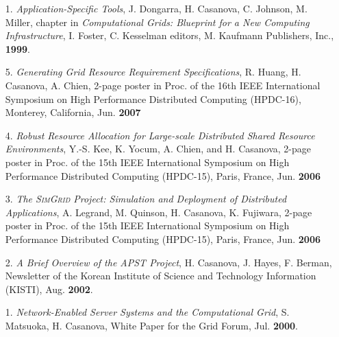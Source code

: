 \begin{itemize}
\item[1.]
{\it Application-Specific Tools}, J. Dongarra, H. Casanova, C. Johnson,
M. Miller, chapter in {\it Computational Grids: Blueprint for a New
Computing Infrastructure}, I. Foster, C. Kesselman editors, M. Kaufmann
Publishers, Inc., {\bf 1999}.

\end{itemize}



\begin{enumerate}

\item[5.]
{\it Generating Grid Resource Requirement Specifications},
R. Huang, H. Casanova, A. Chien, 2-page
poster in Proc. of the 16th IEEE International Symposium on High
Performance Distributed Computing (HPDC-16), Monterey, California, Jun. {\bf 2007}


\item[4.]
{\it Robust Resource Allocation for Large-scale Distributed Shared Resource
Environments}, Y.-S. Kee, K. Yocum, A. Chien, and H. Casanova, 2-page
poster in Proc. of the 15th IEEE International Symposium on High
Performance Distributed Computing (HPDC-15), Paris, France, Jun. {\bf 2006}

\item[3.]
{\it The \textsc{SimGrid} Project: Simulation and Deployment of Distributed Applications}, A. Legrand, M. Quinson, H. Casanova, K. Fujiwara, 2-page
poster in Proc. of the 15th IEEE International Symposium on High
Performance Distributed Computing (HPDC-15), Paris, France, Jun. {\bf 2006}

\item[2.]
{\it  A Brief Overview of the APST Project}, H. Casanova, J. Hayes,
F. Berman, Newsletter of the Korean Institute of Science and Technology
Information (KISTI), Aug. {\bf 2002}.

\item[1.]
{\it Network-Enabled Server Systems and the Computational
Grid}, S. Matsuoka, H. Casanova, White Paper for the Grid Forum,
Jul. {\bf 2000}.

\end{enumerate}

